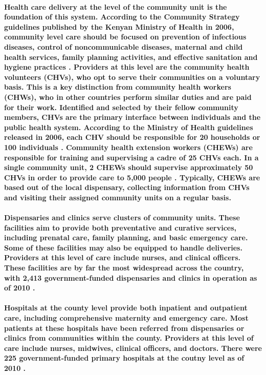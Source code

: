 \paragraph{Health care delivery at the level of the community unit is the foundation of this system. According to the Community Strategy guidelines published by the Kenyan Ministry of Health in 2006, community level care should be focused on prevention of infectious diseases, control of noncommunicable diseases, maternal and child health services, family planning activities, and effective sanitation and hygiene practices \citep{CommunityStrategy2006}. Providers at this level are the community  health volunteers (CHVs), who opt to serve their communities on a voluntary basis. This is a key distinction from community health workers (CHWs), who in other countries perform similar duties and are paid for their work.  Identified and selected by their fellow community members, CHVs are the primary interface between individuals and the public health system. According to the Ministry of Health guidelines released in 2006, each CHV should be responsible for 20 households or 100 individuals \citep{CommunityStrategy2006}. Community health extension workers (CHEWs) are responsible for training and supervising a cadre of 25 CHVs each. In a single community unit, 2 CHEWs should supervise approximately 50 CHVs in order to provide care to 5,000 people \citep{CommunityStrategy2006}. Typically, CHEWs are based out of the local dispensary, collecting information from CHVs and visiting their assigned community units on a regular basis.}

\paragraph{Dispensaries and clinics serve clusters of community units. These facilities aim to provide both preventative and curative services, including prenatal care, family planning, and basic emergency care. Some of these facilities may also be equipped to handle deliveries. Providers at this level of care include nurses, and clinical officers.  These facilities are by far the most widespread across the country, with 2,413 government-funded dispensaries and clinics in operation as of 2010 \citep{SPA2010}.}

\paragraph{Hospitals at the county level provide both inpatient and outpatient care, including comprehensive maternity and emergency care. Most patients at these hospitals have been referred from dispensaries or clinics from communities within the county. Providers at this level of care include nurses, midwives, clinical officers, and doctors. There were 225 government-funded primary hospitals at the coutny level as of 2010 \citep{SPA2010}.}

